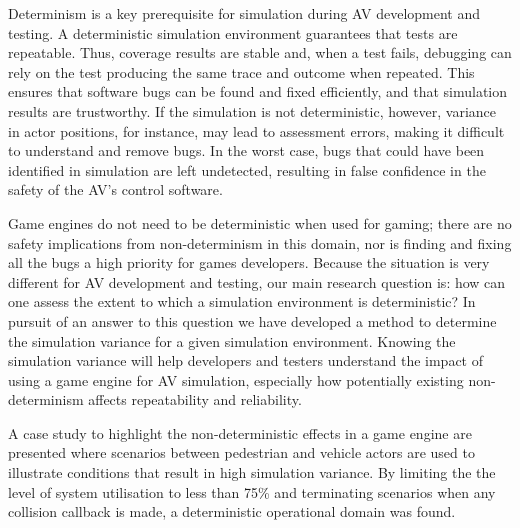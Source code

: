 \documentclass[letterpaper, 10 pt, journal, twoside]{IEEEtran}
\begin{document}


Determinism is a key prerequisite for simulation during AV development and testing. 
%
A deterministic simulation environment guarantees that tests are repeatable. 
%
Thus, coverage results are stable and, when a test fails, debugging can rely on the test producing the same trace and outcome when repeated. This ensures that software bugs can be found and fixed efficiently, and that simulation results are trustworthy. 
%
%
If the simulation is not deterministic, however, variance in actor positions, for instance, may lead to assessment errors, making it difficult to understand and remove bugs. In the worst case, bugs that could have been identified in simulation are left undetected, resulting in false confidence in the safety of the AV's control software.

Game engines do not need to be deterministic when used for gaming; there are no safety implications from non-determinism in this domain, nor is finding and fixing all the bugs a high priority for games developers. Because the situation is very different for AV development and testing, our main research question is: 
how can one assess the extent to which a simulation environment is deterministic? 
%
In pursuit of an answer to this question we have developed a method to determine the simulation variance for a given simulation environment. 
%
Knowing the simulation variance will help developers and testers understand the impact of using a game engine for AV simulation, especially how potentially existing non-determinism affects repeatability and reliability. 

A case study to highlight the non-deterministic effects in a game engine are presented where scenarios between pedestrian and vehicle actors are used to illustrate conditions that result in high simulation variance. By limiting the the level of system utilisation to less than 75\% and terminating scenarios when any collision callback is made, a deterministic operational domain was found.
%
\end{document}

